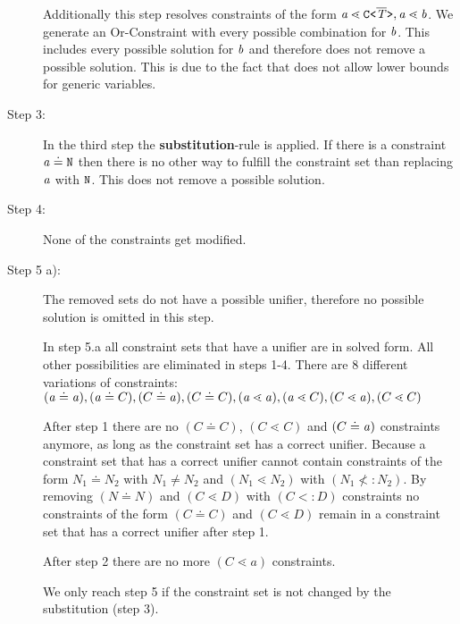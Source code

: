 \begin{description}
Additionally this step resolves constraints of the form $\mathit{ a } \lessdot \mathtt{C \texttt{<} \overline{\tt \mathit{T}} \texttt{>} }, \mathit{ a } \lessdot \mathit{ b }$.
We generate an Or-Constraint with every possible combination for $\mathit{ b }$.
This includes every possible solution for $\mathit{ b }$ and therefore does not remove a possible solution.
This is due to the fact that \TFGJ does not allow lower bounds for generic variables.

\item[Step 3:]
In the third step the \textbf{substitution}-rule is applied.
If there is a constraint $\mathit{ a } \doteq \texttt{N}$ then there is no other way to fulfill the constraint set
than replacing $\mathit{ a }$ with $\texttt{N}$.
This does not remove a possible solution.

\item[Step 4:]
None of the constraints get modified.

\item[Step 5 a):]
The removed sets do not have a possible unifier, therefore no possible solution is
omitted in this step.

In step 5.a all constraint sets that have a unifier are in solved form.
All other possibilities are eliminated in steps 1-4.
There are 8 different variations of constraints:\\
$(\mathit{ a } \doteq \mathit{ a }), (\mathit{ a } \doteq C), (C \doteq \mathit{ a }), (C \doteq C), (\mathit{ a } \lessdot \mathit{ a }), (\mathit{ a } \lessdot C), (C \lessdot \mathit{ a }), (C \lessdot C)$

After step 1 there are no $(C \doteq C)$, $(C \lessdot C)$ and $(C \doteq \mathit{ a })$ constraints anymore,
as long as the constraint set has a correct unifier.
Because a constraint set that has a correct unifier cannot contain constraints of the form $N_1 \doteq N_2$ with $N_1 \neq N_2$ and
$(N_1 \lessdot N_2)$ with $(N_1 \nless: N_2)$.
By removing $(N \doteq N)$ and $(C \lessdot D)$ with $(C <: D)$ constraints
no constraints of the form $(C \doteq C)$ and $(C \lessdot D)$
remain in a constraint set that has a correct unifier after step 1.

After step 2 there are no more $(C \lessdot a)$ constraints.


We only reach step 5 if the constraint set is not changed by the substitution (step 3).



\end{description}
